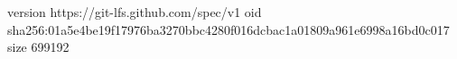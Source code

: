 version https://git-lfs.github.com/spec/v1
oid sha256:01a5e4be19f17976ba3270bbc4280f016dcbac1a01809a961e6998a16bd0c017
size 699192
